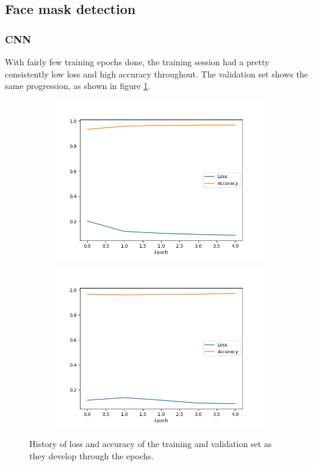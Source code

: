 \documentclass[../main.tex]{subfiles}
\begin{document}
\subsection{Face mask detection}
\subsubsection{CNN}
With fairly few training epochs done, the training session had a pretty consistently low loss and high accuracy throughout. The validation set shows the same progression, as shown in figure \ref{fig:facemasks_cnn_history}.

\begin{figure}[H]
    \begin{subfigure}{.5\textwidth}
        \centering
        \includegraphics[width=1.1\linewidth]{assets/facemasks_train_history.png}
    \end{subfigure}
    \begin{subfigure}{.5\textwidth}
        \centering
        \includegraphics[width=1.1\linewidth]{assets/facemasks_val_history.png}
    \end{subfigure}
    \caption{History of loss and accuracy of the training and validation set as they develop through the epochs.}
    \label{fig:facemasks_cnn_history}
\end{figure}
\end{document}
